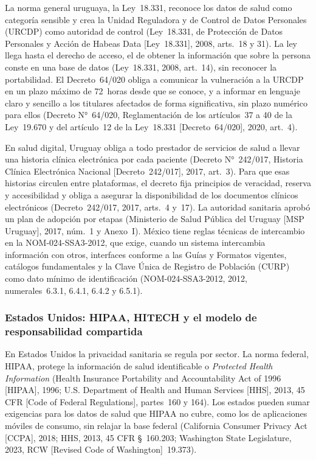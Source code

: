 \documentclass[12pt, a4paper]{article}
\begin{document}
La norma general uruguaya, la Ley~18.331, reconoce los datos de salud
como categoría sensible y crea la Unidad Reguladora y de Control de
Datos Personales (URCDP) como autoridad de control (Ley~18.331, de
Protección de Datos Personales y Acción de Habeas Data [Ley~18.331],
2008, arts.~18 y 31). La ley llega hasta el derecho de acceso, el de obtener la información que sobre la persona conste en una
base de datos (Ley~18.331, 2008, art.~14), sin reconocer la
portabilidad. El Decreto~64/020 obliga a comunicar la vulneración a
la URCDP en un plazo máximo de 72~horas desde que se conoce, y a
informar en lenguaje claro y sencillo a los titulares afectados de
forma significativa, sin plazo numérico para ellos (Decreto
N°~64/020, Reglamentación de los artículos~37 a 40 de la Ley~19.670 y
del artículo~12 de la Ley~18.331 [Decreto~64/020], 2020, art.~4).
 
En salud digital, Uruguay obliga a todo prestador de servicios de
salud a llevar una historia clínica electrónica por cada paciente
(Decreto N°~242/017, Historia Clínica Electrónica Nacional
[Decreto~242/017], 2017, art.~3). Para que esas historias circulen entre
plataformas, el decreto fija principios de veracidad, reserva y
accesibilidad y obliga a asegurar la disponibilidad de los documentos
clínicos electrónicos (Decreto~242/017, 2017, arts.~4 y~17). La
autoridad sanitaria aprobó un plan de adopción por etapas (Ministerio de
Salud Pública del Uruguay [MSP Uruguay], 2017, núm.~1 y Anexo~I). México
tiene reglas técnicas de intercambio en la
NOM-024-SSA3-2012, que exige, cuando un sistema intercambia
información con otros, interfaces conforme a las Guías y Formatos
vigentes, catálogos fundamentales y la Clave Única de Registro de Población (CURP) como dato mínimo de
identificación (NOM-024-SSA3-2012, 2012, numerales~6.3.1, 6.4.1, 6.4.2 y 6.5.1).

\subsubsection{Estados Unidos: HIPAA, HITECH y el modelo de
responsabilidad compartida}

En Estados Unidos la privacidad sanitaria se regula por sector. La
norma federal, HIPAA, protege la información de salud identificable o
\textit{Protected Health Information} (Health Insurance Portability
and Accountability Act of 1996 [HIPAA], 1996; U.S. Department of
Health and Human Services [HHS], 2013, 45 CFR [Code of Federal Regulations], partes~160 y 164). Los
estados pueden sumar exigencias para los datos de salud que HIPAA no
cubre, como los de aplicaciones móviles de consumo, sin relajar la
base federal (California Consumer Privacy Act [CCPA], 2018;
HHS, 2013, 45 CFR \S~160.203; Washington State Legislature, 2023,
RCW [Revised Code of Washington]~19.373).
 
\end{document}
